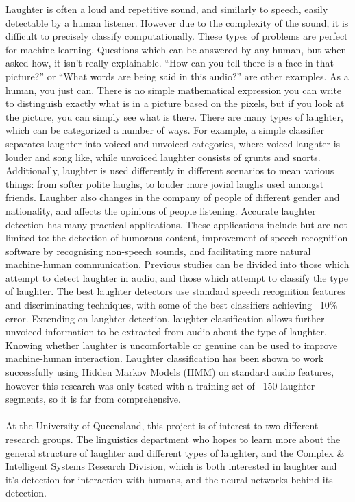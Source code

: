 \documentclass[a4paper,11pt,notitlepage]{article}
\begin{document}
Laughter is often a loud and repetitive sound, and similarly to speech, easily detectable by a human listener. However due to the complexity of the sound, it is difficult to precisely classify computationally. These types of problems are perfect for machine learning. Questions which can be answered by any human, but when asked how, it isn't really explainable. ``How can you tell there is a face in that picture?'' or ``What words are being said in this audio?'' are other examples. As a human, you just can. There is no simple mathematical expression you can write to distinguish exactly what is in a picture based on the pixels, but if you look at the picture, you can simply see what is there. There are many types of laughter, which can be categorized a number of ways. For example, a simple classifier separates laughter into voiced and unvoiced categories, where voiced laughter is louder and song like, while unvoiced laughter consists of grunts and snorts. Additionally, laughter is used differently in different scenarios to mean various things: from softer polite laughs, to louder more jovial laughs used amongst friends.\cite{tanaka2011acoustic} Laughter also changes in the company of people of different gender and nationality,\cite{campbell2007whom} and affects the opinions of people listening.\cite{bachorowski2001not} Accurate laughter detection has many practical applications. These applications include but are not limited to: the detection of humorous content, improvement of speech recognition software by recognising non-speech sounds, and facilitating more natural machine-human communication. Previous studies can be divided into those which attempt to detect laughter in audio, and those which attempt to classify the type of laughter. The best laughter detectors use standard speech recognition features and discriminating techniques\cite{cosentino2016quantitative}, with some of the best classifiers achieving ~10\% error.\cite{gosztolya2016laughter,knox2007automatic,truong2007automatic,truong2005automatic} Extending on laughter detection, laughter classification allows further unvoiced information to be extracted from audio about the type of laughter. Knowing whether laughter is uncomfortable or genuine can be used to improve machine-human interaction. Laughter classification has been shown to work successfully using Hidden Markov Models (HMM) on standard audio features\cite{tanaka2011acoustic}, however this research was only tested with a training set of ~150 laughter segments, so it is far from comprehensive.\\
\\
At the University of Queensland, this project is of interest to two different research groups. The linguistics department who hopes to learn more about the general structure of laughter and different types of laughter, and the Complex \& Intelligent Systems Research Division, which is both interested in laughter and it's detection for interaction with humans, and the neural networks behind its detection.
\end{document}
